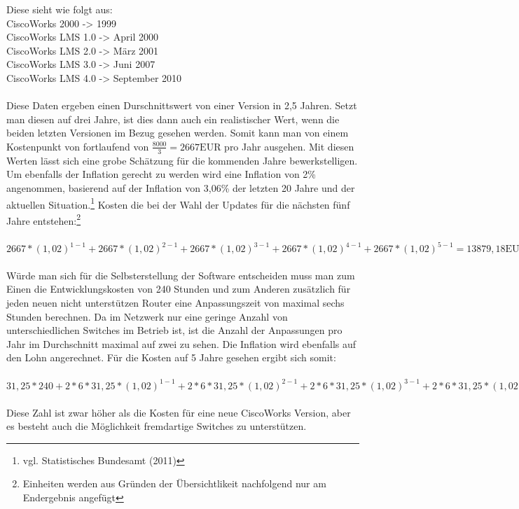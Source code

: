 Diese sieht wie folgt aus:
\\
CiscoWorks 2000 -> 1999\\
CiscoWorks LMS 1.0 -> April 2000\\
CiscoWorks LMS 2.0 -> März 2001 \\
CiscoWorks LMS 3.0 -> Juni 2007\\
CiscoWorks LMS 4.0 -> September 2010\\
\\
Diese Daten ergeben einen Durschnittswert von einer Version in 2,5 Jahren.
Setzt man diesen auf drei Jahre, ist dies dann auch ein realistischer Wert, wenn die beiden letzten Versionen im Bezug gesehen werden. Somit kann man von einem Kostenpunkt von fortlaufend von \(\frac{8000}{3}=2667\text{EUR}\) pro Jahr ausgehen. Mit diesen Werten lässt sich eine grobe Schätzung für die kommenden Jahre bewerkstelligen.
Um ebenfalls der Inflation gerecht zu werden wird eine Inflation von 2\% angenommen, basierend auf der Inflation von 3,06\% der letzten 20 Jahre und der aktuellen Situation.\footnote{vgl. Statistisches Bundesamt (2011)}
Kosten die bei der Wahl der Updates für die nächsten fünf Jahre entstehen:\footnote{Einheiten werden aus Gründen der Übersichtlikeit nachfolgend nur am Endergebnis angefügt}\\
\\
\(2667*(1,02)^{1-1}+2667*(1,02)^{2-1}+2667*(1,02)^{3-1}+2667*(1,02)^{4-1}+2667*(1,02)^{5-1}=13879,18\text{EUR}\)\\
\\
Würde man sich für die Selbsterstellung der Software entscheiden muss man zum Einen die Entwicklungskosten von 240 Stunden und zum Anderen zusätzlich für jeden neuen nicht unterstützen Router eine Anpassungszeit von maximal sechs Stunden berechnen.
Da im Netzwerk nur eine geringe Anzahl von unterschiedlichen Switches im Betrieb ist, ist die Anzahl der Anpassungen pro Jahr im Durchschnitt maximal auf zwei zu sehen.
Die Inflation wird ebenfalls auf den Lohn angerechnet. Für die Kosten auf 5 Jahre gesehen ergibt sich somit:\\
\\
\(31,25*240+2*6*31,25*(1,02)^{1-1}+2*6*31,25*(1,02)^{2-1}+2*6*31,25*(1,02)^{3-1}+2*6*31,25*(1,02)^{4-1}+2*6*31,25*(1,02)^{5-1}=9451,52\text{EUR}\)
\\
\\
Diese Zahl ist zwar höher als die Kosten für eine neue CiscoWorks Version, aber es besteht auch die Möglichkeit fremdartige Switches zu unterstützen.
